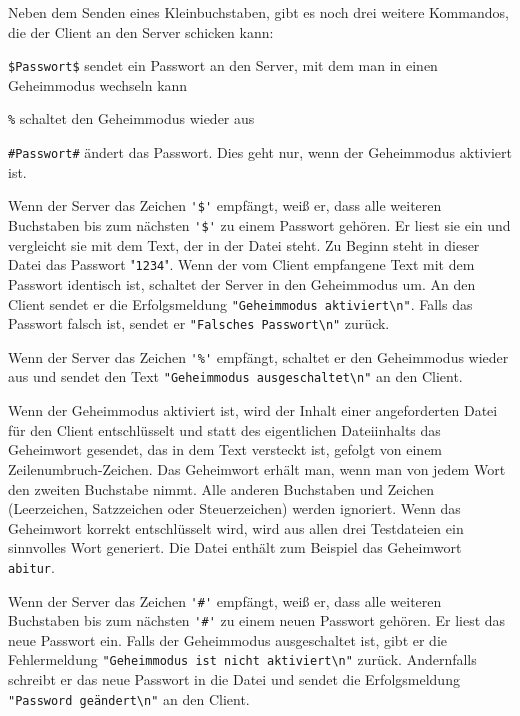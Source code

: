Neben dem Senden eines Kleinbuchstaben, gibt es noch drei weitere Kommandos,
die der Client an den Server schicken kann:

\begin{compactitem}
\item \lstinline|$Passwort$| sendet ein Passwort an den Server, mit dem man in
einen Geheimmodus wechseln kann

\item \lstinline|%| schaltet den Geheimmodus wieder aus

\item \lstinline|#Passwort#| ändert das Passwort. Dies geht nur, wenn der
Geheimmodus aktiviert ist.
\end{compactitem}

Wenn der Server das Zeichen \lstinline|'$'| empfängt, weiß er, dass alle
weiteren Buchstaben bis zum nächsten \lstinline|'$'| zu einem Passwort
gehören. Er liest sie ein und vergleicht sie mit dem Text, der in der Datei
 steht. Zu Beginn steht in dieser Datei das Passwort
"\lstinline|1234|". Wenn der vom Client empfangene Text mit dem Passwort
identisch ist, schaltet der Server in den Geheimmodus um. An den Client sendet
er die Erfolgsmeldung \lstinline|"Geheimmodus aktiviert\n"|. Falls das Passwort
falsch ist, sendet er \lstinline|"Falsches Passwort\n"| zurück.

Wenn der Server das Zeichen \lstinline|'%'| empfängt, schaltet er den
Geheimmodus wieder aus und sendet den Text 
\lstinline|"Geheimmodus ausgeschaltet\n"| an den Client.

Wenn der Geheimmodus aktiviert ist, wird der Inhalt einer angeforderten Datei
für den Client entschlüsselt und statt des eigentlichen Dateiinhalts das
Geheimwort gesendet, das in dem Text versteckt ist, gefolgt von einem
Zeilenumbruch-Zeichen. Das Geheimwort erhält man, wenn man von jedem Wort den
zweiten Buchstabe nimmt. Alle anderen Buchstaben und Zeichen (Leerzeichen,
Satzzeichen oder Steuerzeichen) werden ignoriert. Wenn das Geheimwort korrekt
entschlüsselt wird, wird aus allen drei Testdateien ein sinnvolles Wort
generiert. Die Datei  enthält zum Beispiel das Geheimwort
\lstinline|abitur|.

Wenn der Server das Zeichen \lstinline|'#'| empfängt, weiß er, dass alle
weiteren Buchstaben bis zum nächsten \lstinline|'#'| zu einem neuen Passwort
gehören. Er liest das neue Passwort ein. Falls der Geheimmodus ausgeschaltet
ist, gibt er die Fehlermeldung \lstinline|"Geheimmodus ist nicht aktiviert\n"|
zurück. Andernfalls schreibt er das neue Passwort in die Datei
 und sendet die Erfolgsmeldung 
\lstinline|"Password geändert\n"| an den Client.

